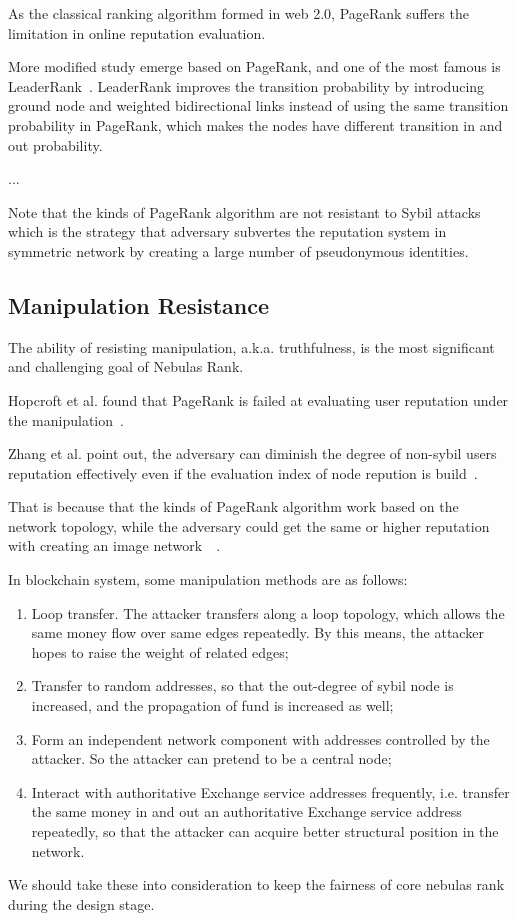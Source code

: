 As the classical ranking algorithm formed in web 2.0, PageRank suffers the limitation in online reputation evaluation.

More modified study emerge based on PageRank, and one of the most famous is LeaderRank~\cite{Li2014}. LeaderRank improves the transition probability by introducing ground node and weighted bidirectional links instead of using the same transition probability in PageRank, which makes the nodes have different transition in and out probability.

...

Note that the kinds of PageRank algorithm are not resistant to Sybil attacks~\cite{cheng2006manipulability} which is the strategy that adversary subvertes the reputation system in symmetric network by creating a large number of pseudonymous identities.


\subsection{Manipulation Resistance}
The ability of resisting manipulation, a.k.a. truthfulness, is the most significant and challenging goal of Nebulas Rank. 

Hopcroft et al. found that PageRank is failed at evaluating user reputation under the manipulation~\cite{hopcroft2007manipulation}.

Zhang et al. point out, the adversary can diminish the degree of non-sybil users reputation effectively even if the evaluation index of node repution is build~\cite{zhang2016truetop}.

That is because that the kinds of PageRank algorithm work based on the network topology, while the adversary could get the same or higher reputation with creating an image network~\cite{cheng2005sybilproof}~\cite{cheng2006manipulability}.

In blockchain system, some manipulation methods are as follows:
\begin{enumerate}
\item Loop transfer. The attacker transfers along a loop topology, which allows the same money flow over same edges repeatedly. By this means, the attacker hopes to raise the weight of related edges;
\item Transfer to random addresses, so that the out-degree of sybil node is increased, and the propagation of fund is increased as well;
\item Form an independent network component with addresses controlled by the attacker. So the attacker can pretend to be a central node;
\item Interact with authoritative Exchange service addresses frequently, i.e. transfer the same money in and out an authoritative Exchange service address repeatedly, so that the attacker can acquire better structural position in the network.
\end{enumerate}

We should take these into consideration to keep the fairness of core nebulas rank during the design stage.


